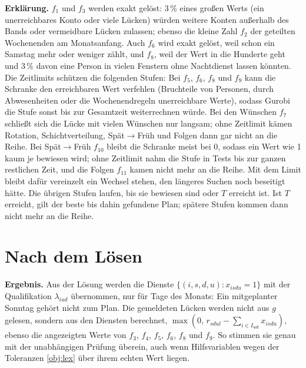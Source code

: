 \documentclass[11pt]{combiArticle}
\begin{document}
\textbf{Erklärung.}
$f_1$ und $f_3$ werden exakt gelöst: 3\,\% eines großen Werts (ein unerreichbares Konto oder viele Lücken) würden
weitere Konten außerhalb des Bands oder vermeidbare Lücken zulassen; ebenso die kleine Zahl $f_2$ der geteilten
Wochenenden am Monatsanfang. Auch $f_6$ wird exakt gelöst, weil schon ein Samstag mehr oder weniger zählt, und
$f_8$, weil der Wert in die Hunderte geht und 3\,\% davon eine Person in vielen Fenstern ohne Nachtdienst lassen
könnten. Die Zeitlimits schützen die folgenden Stufen: Bei $f_5$, $f_6$, $f_8$ und $f_9$ kann die Schranke den
erreichbaren Wert verfehlen (Bruchteile von Personen, durch Abwesenheiten oder die Wochenendregeln unerreichbare
Werte), sodass Gurobi die Stufe sonst bis zur Gesamtzeit weiterrechnen würde. Bei den Wünschen $f_7$ schließt
sich die Lücke mit vielen Wünschen nur langsam; ohne Zeitlimit kämen Rotation, Schichtverteilung, Spät$\to$Früh
und Folgen dann gar nicht an die Reihe. Bei Spät$\to$Früh $f_{10}$ bleibt die Schranke meist bei 0, sodass ein
Wert wie 1 kaum je bewiesen wird; ohne Zeitlimit nahm die Stufe in Tests bis zur ganzen restlichen Zeit, und die
Folgen $f_{11}$ kamen nicht mehr an die Reihe. Mit dem Limit bleibt dafür vereinzelt ein Wechsel stehen, den
längeres Suchen noch beseitigt hätte. Die übrigen Stufen laufen, bis sie bewiesen sind oder $T$ erreicht ist. Ist
$T$ erreicht, gilt der beste bis dahin gefundene Plan; spätere Stufen kommen dann nicht mehr an die Reihe.

\section{Nach dem Lösen}

\textbf{Ergebnis.} Aus der Lösung werden die Dienste $\{(i,s,d,u) : x_{isdu} = 1\}$ mit der Qualifikation
$\lambda_{iud}$ übernommen, nur für Tage des Monats: Ein mitgeplanter Sonntag gehört nicht zum Plan. Die
gemeldeten Lücken werden nicht aus $g$ gelesen, sondern aus den Diensten berechnet, $\max(0,\, r_{sdul} - \sum_{i
\in I_{udl}} x_{isdu})$, ebenso die angezeigten Werte von $f_3$, $f_4$, $f_5$, $f_6$, $f_8$ und $f_9$. So stimmen
sie genau mit der unabhängigen Prüfung überein, auch wenn Hilfsvariablen wegen der Toleranzen \eqref{obj:lex} über
ihrem echten Wert liegen.
\end{document}
